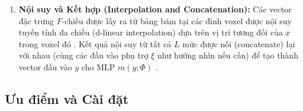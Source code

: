 \begin{enumerate}
\begin{itemize}
            \item Mạng MLP theo sau: Mạng neural nhỏ $m$ học cách phân giải các xung đột còn lại bằng cách kết hợp thông tin từ nhiều mức phân giải (các mức thô thường không có xung đột) \cite{Muller2022InstantNGP_source_99, Muller2022InstantNGP_source_119, Muller2022InstantNGP_source_142, Muller2022InstantNGP_source_149}.
        \end{itemize}
    \item \textbf{Nội suy và Kết hợp (Interpolation and Concatenation):} Các vector đặc trưng $F$-chiều được lấy ra từ bảng băm tại các đỉnh voxel được nội suy tuyến tính đa chiều (d-linear interpolation) dựa trên vị trí tương đối của $x$ trong voxel đó \cite{Muller2022InstantNGP_source_105, Muller2022InstantNGP_source_123}. Kết quả nội suy từ tất cả $L$ mức được nối (concatenate) lại với nhau (cùng các đầu vào phụ trợ $\xi$ như hướng nhìn nếu cần) để tạo thành vector đầu vào $y$ cho MLP $m(y; \Phi)$ \cite{Muller2022InstantNGP_source_106, Muller2022InstantNGP_source_124}.
\end{enumerate}

\subsection{Ưu điểm và Cài đặt}

